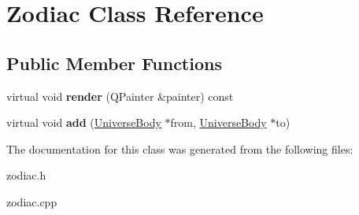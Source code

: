 \hypertarget{classZodiac}{}\section{Zodiac Class Reference}
\label{classZodiac}
\subsection*{Public Member Functions}
\begin{DoxyCompactItemize}
\item 
virtual void {\bfseries render} (Q\+Painter \&painter) const\hypertarget{classZodiac_afd9c80e90ed00d1302ab70d97aabc40c}{}\label{classZodiac_afd9c80e90ed00d1302ab70d97aabc40c}

\item 
virtual void {\bfseries add} (\hyperlink{classUniverseBody}{Universe\+Body} $\ast$from, \hyperlink{classUniverseBody}{Universe\+Body} $\ast$to)\hypertarget{classZodiac_a2bb308851769d1657b2c02e9f2b4e553}{}\label{classZodiac_a2bb308851769d1657b2c02e9f2b4e553}

\end{DoxyCompactItemize}


The documentation for this class was generated from the following files\+:\begin{DoxyCompactItemize}
\item 
zodiac.\+h\item 
zodiac.\+cpp\end{DoxyCompactItemize}
